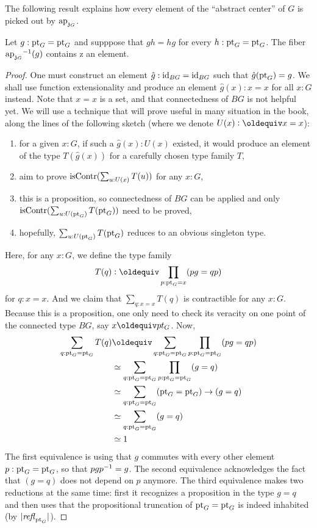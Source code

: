The following result explains how every element of the ``abstract
center'' of $G$ is picked out by $\mathop{\mathrm{ap}_{\mathfrak z_{{G}}}}$.
\begin{lemma}
  \label{lemma:center-inc-surj-on-paths}%
  Let $g:\mathrm{pt}_G = \mathrm{pt}_G$ and supppose that $gh=hg$ for every
  $h:\mathrm{pt}_G=\mathrm{pt}_G$. The fiber $\mathop{\mathrm{ap}_{\mathfrak z_{{G}}}}^{-1}(g)$ contains
z  an element.
\end{lemma}
\begin{proof}
  One must construct an element $\hat g:\mathord{\mathrm{id}}_{BG} = \mathord{\mathrm{id}}_{BG}$ such that
  $\hat g(\mathrm{pt}_G)=g$. We shall use function extensionality and produce
  an element $\hat g(x):x=x$ for all $x:G$ instead. Note that $x=x$ is
  a set, and that connectedness of $BG$ is not helpful yet. We will
  use a technique that will prove useful in many situation in the
  book, along the lines of the following sketch (where we denote
  $U(x)\defequi x=x$):
  \begin{enumerate}
  \item for a given $x:G$, if such a $\hat g(x):U(x)$ existed, it would
    produce an element of the type $T(\hat g(x))$ for a carefully chosen type
    family $T$,
  \item aim to prove $\mathrm{isContr}(\sum_{u:U(x)}T(u))$ for any $x:G$,
  \item this is a proposition, so connectedness of $BG$ can be applied
    and only $\mathrm{isContr}(\sum_{u:U(\mathrm{pt}_G)}T(\mathrm{pt}_G))$ need to be proved,
  \item hopefully, $\sum_{u:U(\mathrm{pt}_G)}T(\mathrm{pt}_G)$ reduces to an obvious
    singleton type.
  \end{enumerate}
  Here, for any $x:G$, we define the type family
  \begin{displaymath}
    T(q) \defequi \prod_{p:\pt_G=x} (pg=qp)
  \end{displaymath}
  for $q:x=x$. And we claim that $\sum_{q:x=x}T(q)$ is contractible
  for any $x:G$. Because this is a proposition, one only need to check
  its veracity on one point of the connected type $BG$, say
  $x\jdeq pt_G$. Now,
  \begin{displaymath}
    \begin{aligned}
      \sum_{q:\pt_G=\pt_G}T(q) &\jdeq \sum_{q:\pt_G=\pt_G}\prod_{p:\pt_G=\pt_G}(pg=qp)
      \\
      &\weq \sum_{q:\pt_G=\pt_G}\prod_{p:\pt_G=\pt_G}(g=q)
      \\
      &\weq \sum_{q:\pt_G=\pt_G}(\pt_G=\pt_G)\to (g=q)
      \\
      &\weq \sum_{q:\pt_G=\pt_G} (g=q)
      \\
      &\weq 1
    \end{aligned}
  \end{displaymath}
  The first equivalence is using that $g$ commutes with every other
  element $p:\mathrm{pt}_G=\mathrm{pt}_G$, so that $pg p^{-1} = g$. The second
  equivalence acknowledges the fact that $(g=q)$ does not depend on
  $p$ anymore. The third equivalence makes two reductions at the same
  time: first it recognizes a proposition in the type $g=q$ and then
  uses that the propositional truncation of $\mathrm{pt}_G=\mathrm{pt}_G$ is indeed
  inhabited (by $\lvert\mathop{\mathit{refl}_{\mathrm{pt}_G}}\rvert$).


\end{proof}
